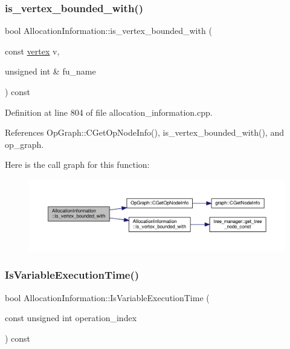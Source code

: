 \subsubsection{\texorpdfstring{is\+\_\+vertex\+\_\+bounded\+\_\+with()}{is\_vertex\_bounded\_with()}\hspace{0.1cm}{\footnotesize\ttfamily [2/2]}}
{\footnotesize\ttfamily bool Allocation\+Information\+::is\+\_\+vertex\+\_\+bounded\+\_\+with (\begin{DoxyParamCaption}\item[{const \hyperlink{graph_8hpp_abefdcf0544e601805af44eca032cca14}{vertex}}]{v,  }\item[{unsigned int \&}]{fu\+\_\+name }\end{DoxyParamCaption}) const}



Definition at line 804 of file allocation\+\_\+information.\+cpp.



References Op\+Graph\+::\+C\+Get\+Op\+Node\+Info(), is\+\_\+vertex\+\_\+bounded\+\_\+with(), and op\+\_\+graph.

Here is the call graph for this function\+:
\nopagebreak
\begin{figure}[H]
\begin{center}
\leavevmode
\includegraphics[width=350pt]{d7/d79/classAllocationInformation_af51d3df93977eec2dcab91f789c08d38_cgraph}
\end{center}
\end{figure}
\mbox{\label{classAllocationInformation_a57b2fe03c5c482134de341b1368f8533}} 
\subsubsection{\texorpdfstring{Is\+Variable\+Execution\+Time()}{IsVariableExecutionTime()}}
{\footnotesize\ttfamily bool Allocation\+Information\+::\+Is\+Variable\+Execution\+Time (\begin{DoxyParamCaption}\item[{const unsigned int}]{operation\+\_\+index }\end{DoxyParamCaption}) const}




